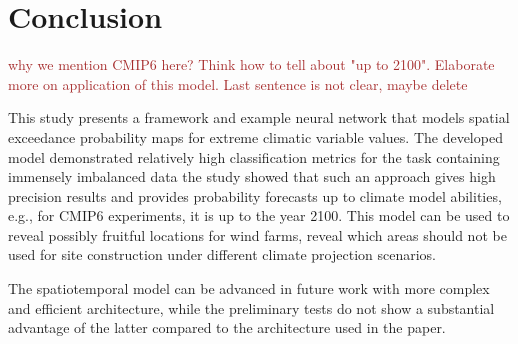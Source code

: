 \documentclass{article}
\begin{document}

\section{Conclusion}
\label{sec:conclusion} 
\textcolor{brown}{why we mention CMIP6 here? Think how to tell about "up to 2100". Elaborate more on application of this model. Last sentence is not clear, maybe delete}

This study presents a framework and example neural network that models spatial exceedance probability maps for extreme climatic variable values. The developed model demonstrated relatively high classification metrics for the task containing immensely imbalanced data
the study showed that such an approach gives high precision results and provides probability forecasts up to climate model abilities, e.g., for CMIP6 experiments, it is up to the year 2100. This model can be used to reveal possibly fruitful locations for wind farms, reveal which areas should not be used for site construction under different climate projection scenarios.

The spatiotemporal model can be advanced in future work with more complex and efficient architecture, while the preliminary tests do not show a substantial advantage of the latter compared to the architecture used in the paper. 



\end{document}
